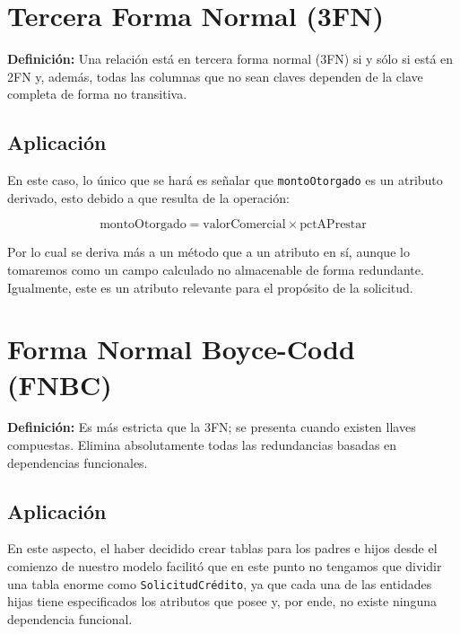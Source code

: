 \documentclass[12pt, a4paper]{article}
\begin{document}
\section{Tercera Forma Normal (3FN)}

\textbf{Definición:} Una relación está en tercera forma normal (3FN) si y sólo si está en 2FN y, además, todas las columnas que no sean claves dependen de la clave completa de forma no transitiva.

\subsection*{Aplicación}

En este caso, lo único que se hará es señalar que \texttt{montoOtorgado} es un atributo derivado, esto debido a que resulta de la operación:

\[
\text{montoOtorgado} = \text{valorComercial} \times \text{pctAPrestar}
\]

Por lo cual se deriva más a un método que a un atributo en sí, aunque lo tomaremos como un campo calculado no almacenable de forma redundante. Igualmente, este es un atributo relevante para el propósito de la solicitud.

\vspace{0.3cm}
\noindent
{}

\newpage

\section{Forma Normal Boyce-Codd (FNBC)}

\textbf{Definición:} Es más estricta que la 3FN; se presenta cuando existen llaves compuestas. Elimina absolutamente todas las redundancias basadas en dependencias funcionales.

\subsection*{Aplicación}

En este aspecto, el haber decidido crear tablas para los padres e hijos desde el comienzo de nuestro modelo facilitó que en este punto no tengamos que dividir una tabla enorme como \texttt{SolicitudCrédito}, ya que cada una de las entidades hijas tiene especificados los atributos que posee y, por ende, no existe ninguna dependencia funcional.
\end{document}
